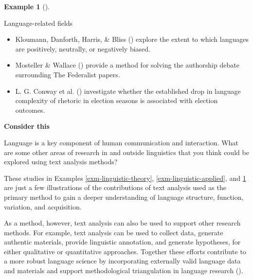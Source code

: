 \documentclass[
  letterpaper,
  krantz1]{latex/krantz-mod}
\providecommand{\tightlist}{%
  \setlength{\itemsep}{0pt}\setlength{\parskip}{0pt}}\usepackage{longtable,booktabs,array}
\theoremstyle{definition}
\theoremstyle{definition}
\newtheorem{example}{Example}[chapter]
\theoremstyle{remark}
\begin{document}
\begin{example}[]\protect\hypertarget{exm-other-fields}{}\label{exm-other-fields}

Language-related fields

\begin{itemize}
\tightlist
\item
  Kloumann, Danforth, Harris, \& Bliss
  () explore the extent to which
  languages are positively, neutrally, or negatively biased.
\item
  Mosteller \& Wallace () provide a
  method for solving the authorship debate surrounding The Federalist
  papers.
\item
  L. G. Conway et al. () investigate
  whether the established drop in language complexity of rhetoric in
  election seasons is associated with election outcomes.
\end{itemize}

\end{example}

\begin{tcolorbox}[enhanced jigsaw, toprule=.15mm, breakable, colback=white, arc=.35mm, left=2mm, colframe=quarto-callout-color-frame, opacityback=0, bottomrule=.15mm, rightrule=.15mm, leftrule=.75mm]

\textbf{ Consider this}

Language is a key component of human communication and interaction. What
are some other areas of research in and outside linguistics that you
think could be explored using text analysis methods?

\end{tcolorbox}

These studies in Examples \ref{exm-linguistic-theory},
\ref{exm-linguistic-applied}, and \ref{exm-other-fields} are just a few
illustrations of the contributions of text analysis used as the primary
method to gain a deeper understanding of language structure, function,
variation, and acquisition.

As a method, however, text analysis can also be used to support other
research methods. For example, text analysis can be used to collect
data, generate authentic materials, provide linguistic annotation, and
generate hypotheses, for either qualitative or quantitative approaches.
Together these efforts contribute to a more robust language science by
incorporating externally valid language data and materials and support
methodological triangulation in language research
().
\end{document}
